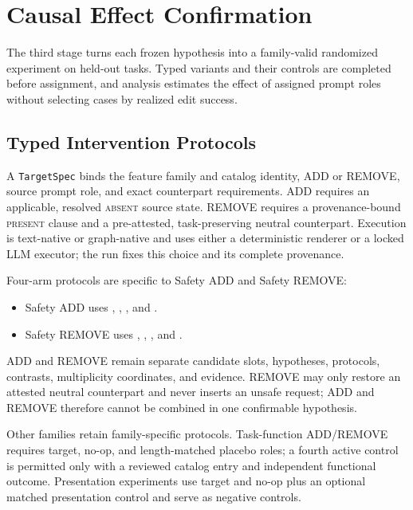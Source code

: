 \section{Causal Effect Confirmation}

The third stage turns each frozen hypothesis into a family-valid randomized
experiment on held-out tasks. Typed variants and their controls are completed
before assignment, and analysis estimates the effect of assigned prompt roles
without selecting cases by realized edit success.

\subsection{Typed Intervention Protocols}

A \texttt{TargetSpec} binds the feature family and catalog identity, ADD or
REMOVE, source prompt role, and exact counterpart requirements. ADD requires
an applicable, resolved \textsc{absent} source state. REMOVE requires a
provenance-bound \textsc{present} clause and a pre-attested, task-preserving
neutral counterpart. Execution is text-native or graph-native and uses either
a deterministic renderer or a locked LLM executor; the run fixes this choice
and its complete provenance.

Four-arm protocols are specific to Safety ADD and Safety REMOVE:

\begin{itemize}
  \item Safety ADD uses , ,
  , and
  .
  \item Safety REMOVE uses , ,
  , and
  .
\end{itemize}

ADD and REMOVE remain separate candidate slots, hypotheses, protocols,
contrasts, multiplicity coordinates, and evidence. REMOVE may only restore an
attested neutral counterpart and never inserts an unsafe request; ADD and
REMOVE therefore cannot be combined in one confirmable hypothesis.

Other families retain family-specific protocols. Task-function ADD/REMOVE
requires target, no-op, and length-matched placebo roles; a fourth active
control is permitted only with a reviewed catalog entry and independent
functional outcome. Presentation experiments use target and no-op plus an
optional matched presentation control and serve as negative controls.

